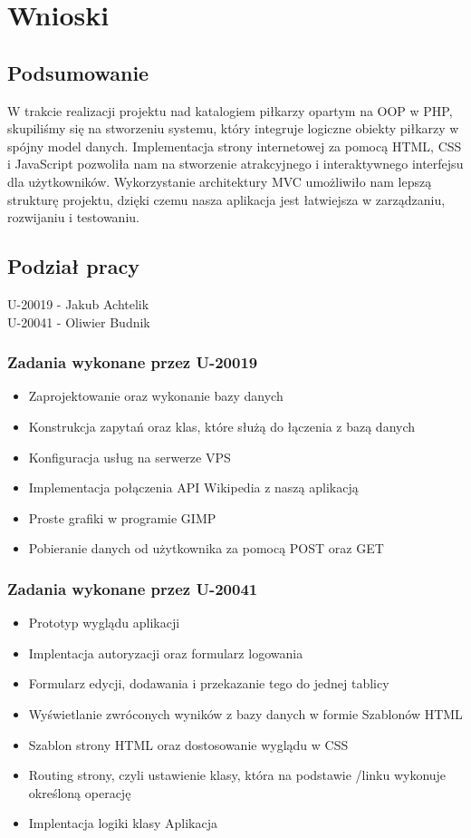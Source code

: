 \section{Wnioski}
    \subsection{Podsumowanie}
    W trakcie realizacji projektu nad katalogiem piłkarzy opartym na OOP w PHP, skupiliśmy się na stworzeniu  systemu, który integruje logiczne obiekty piłkarzy w spójny model danych. Implementacja strony internetowej za pomocą HTML, CSS i JavaScript pozwoliła nam na stworzenie atrakcyjnego i interaktywnego interfejsu dla użytkowników. Wykorzystanie architektury MVC umożliwiło nam lepszą strukturę projektu, dzięki czemu nasza aplikacja jest łatwiejsza w zarządzaniu, rozwijaniu i testowaniu.
    \subsection{Podział pracy}

    U-20019 - Jakub Achtelik\\
    U-20041 - Oliwier Budnik\\

    \subsubsection{Zadania wykonane przez U-20019}
    \begin{itemize}
        \item Zaprojektowanie oraz wykonanie bazy danych
        \item Konstrukcja zapytań oraz klas, które służą do łączenia z bazą danych
        \item Konfiguracja usług na serwerze VPS
        \item Implementacja połączenia API Wikipedia z naszą aplikacją
        \item Proste grafiki w programie GIMP
        \item Pobieranie danych od użytkownika za pomocą POST oraz GET
    \end{itemize}
    \subsubsection{Zadania wykonane przez U-20041}
    \begin{itemize}

        \item Prototyp wyglądu aplikacji
        \item Implentacja autoryzacji oraz formularz logowania
        \item Formularz edycji, dodawania i przekazanie tego do jednej tablicy
        \item Wyświetlanie zwróconych wyników z bazy danych w formie Szablonów HTML
        \item Szablon strony HTML oraz dostosowanie wyglądu w CSS
        \item Routing strony, czyli ustawienie klasy, która na podstawie /linku wykonuje określoną operację
        \item Implentacja logiki klasy Aplikacja
    \end{itemize}
